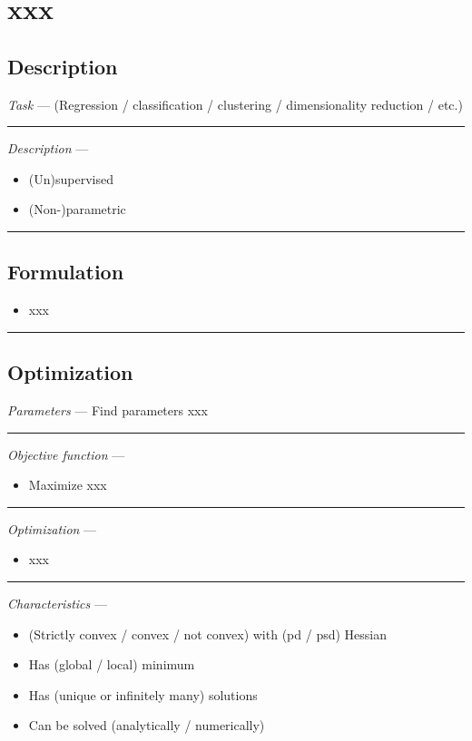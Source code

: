 \section{xxx}
\subsection*{Description}
\emph{Task} --- (Regression / classification / clustering / dimensionality reduction / etc.)

{\color{lightgray}\hrule height 0.001mm}

\emph{Description} --- 
\begin{itemize}
    \item (Un)supervised
    \item (Non-)parametric
\end{itemize}

{\color{black}\hrule height 0.001mm}

\subsection*{Formulation}

\begin{itemize}
    \item xxx
\end{itemize}

{\color{black}\hrule height 0.001mm}

\subsection*{Optimization}
\emph{Parameters} --- Find parameters xxx

{\color{lightgray}\hrule height 0.001mm}

\emph{Objective function} --- 
\begin{itemize}
    \item Maximize xxx
\end{itemize}

{\color{lightgray}\hrule height 0.001mm}

\emph{Optimization} ---
\begin{itemize}
    \item xxx
\end{itemize}

{\color{lightgray}\hrule height 0.001mm}

\emph{Characteristics} --- 
\begin{itemize}
    \item (Strictly convex / convex / not convex) with (pd / psd) Hessian
    \item Has (global / local) minimum
    \item Has (unique or infinitely many) solutions
    \item Can be solved (analytically / numerically) 
\end{itemize}